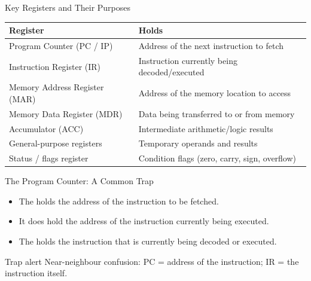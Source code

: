 \documentclass[aspectratio=169]{beamer}
\begin{document}
\begin{frame}{Key Registers and Their Purposes}
  \begin{center}
    \begin{tabular}{ll}
      \toprule
      \textbf{Register} & \textbf{Holds} \\
      \midrule
      Program Counter (PC / IP) & Address of the next instruction to fetch \\
      Instruction Register (IR) & Instruction currently being decoded/executed \\
      Memory Address Register (MAR) & Address of the memory location to access \\
      Memory Data Register (MDR) & Data being transferred to or from memory \\
      Accumulator (ACC) & Intermediate arithmetic/logic results \\
      General-purpose registers & Temporary operands and results \\
      Status / flags register & Condition flags (zero, carry, sign, overflow) \\
      \bottomrule
    \end{tabular}
  \end{center}
  \vspace{0.2cm}
\end{frame}

\begin{frame}{The Program Counter: A Common Trap}
  \begin{itemize}
    \item The  holds the address of the
       instruction to be fetched.
    \item It does  hold the address of the instruction currently
      being executed.
    \item The  holds the instruction that is
      currently being decoded or executed.
  \end{itemize}
  \begin{alertblock}{Trap alert}
    Near-neighbour confusion: PC = address of the 
    instruction; IR = the  instruction itself.
  \end{alertblock}
\end{frame}
\end{document}

